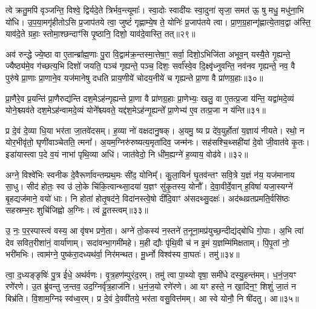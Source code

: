 {\anuvakamend[{उ॒प॒या॒मगृ॑हीतो जुहोमि॒ त्रिच॑त्वारिꣳशच्च॥९॥}]}

त्वे क्रतु॒मपि॑ वृञ्जन्ति॒ विश्वे॒ द्विर्यदे॒ते त्रिर्भव॒न्त्यूमाः᳚। स्वा॒दोः स्वादी॑यः स्वा॒दुना॑ सृजा॒ समत॑ ऊ॒ षु मधु॒ मधु॑ना॒भि यो॑धि। उ॒प॒या॒मगृ॑हीतो\-ऽसि प्र॒जाप॑तये त्वा॒ जुष्टं॑ गृह्णाम्ये॒ष ते॒ योनिः॑ प्र॒जाप॑तये त्वा। प्रा॒ण॒ग्र॒हान्गृ॑ह्णात्ये॒ताव॒द्वा अ॑स्ति॒ याव॑दे॒ते ग्रहाः॒ स्तोमा॒श्छन्दाꣳ॑सि पृ॒ष्ठानि॒ दिशो॒ याव॑दे॒वास्ति॒ तत्॥२९॥

अव॑ रुन्द्धे ज्ये॒ष्ठा वा ए॒तान्ब्रा᳚ह्म॒णाः पु॒रा वि॒द्वाम॑क्र॒न्तस्मा॒त्तेषा॒ꣳ॒ सर्वा॒ दिशो॒\-ऽभिजि॑ता अभूव॒न् यस्यै॒ते गृ॒ह्यन्ते॒ ज्यैष्ठ्य॑मे॒व ग॑च्छत्य॒भि दिशो॑ जयति॒ पञ्च॑ गृह्यन्ते॒ पञ्च॒ दिशः॒ सर्वा᳚स्वे॒व दि॒क्ष्वृ॑ध्नुवन्ति॒ नव॑नव गृह्यन्ते॒ नव॒ वै पुरु॑षे प्रा॒णाः प्रा॒णाने॒व यज॑मानेषु दधति प्राय॒णीये॑ चोदय॒नीये॑ च गृह्यन्ते प्रा॒णा वै प्रा॑णग्र॒हाः॥३०॥

प्रा॒णैरे॒व प्र॒यन्ति॑ प्रा॒णैरुद्य॑न्ति दश॒मे\-ऽह॑न्गृह्यन्ते प्रा॒णा वै प्रा॑णग्र॒हाः प्रा॒णेभ्यः॒ खलु॒ वा ए॒तत्प्र॒जा य॑न्ति॒ यद्वा॑मदे॒व्यं योने॒श्च्यव॑ते दश॒मे\-ऽह॑न्वामदे॒व्यं योने᳚श्च्यवते॒ यद्द॑श॒मे\-ऽह॑न्गृ॒ह्यन्ते᳚ प्रा॒णेभ्य॑ ए॒व तत्प्र॒जा न य॑न्ति॥३१॥

{\anuvakamend[{तत्प्रा॑णग्र॒हाः स॒प्तत्रिꣳ॑शच्च॥10॥}]}

प्र दे॒वं दे॒व्या धि॒या भर॑ता जा॒तवे॑दसम्। ह॒व्या नो॑ वक्षदानु॒षक्। अ॒यमु॒ ष्य प्र दे॑व॒युर्\mbox{}होता॑ य॒ज्ञाय॑ नीयते। रथो॒ न योर॒भीवृ॑तो॒ घृणी॑वाञ्चेतति॒ त्मना᳚। अ॒यम॒ग्निरु॑रुष्यत्य॒मृता॑दिव॒ जन्म॑नः। सह॑सश्चि॒थ्सही॑यां दे॒वो जी॒वात॑वे कृ॒तः। इडा॑यास्त्वा प॒दे व॒यं नाभा॑ पृथि॒व्या अधि॑। जात॑वेदो॒ नि धी॑म॒ह्यग्ने॑ ह॒व्याय॒ वोढ॑वे।॥३२॥

अग्ने॒ विश्वे॑भिः स्वनीक दे॒वैरूर्णा॑वन्तम्प्रथ॒मः सी॑द॒ योनिम्᳚। कु॒ला॒यिनं॑ घृ॒तव॑न्तꣳ सवि॒त्रे य॒ज्ञं न॑य॒ यज॑मानाय सा॒धु। सीद॑ होतः॒ स्व उ॑ लो॒के चि॑कि॒त्वान्थ्सा॒दया॑ य॒ज्ञꣳ सु॑कृ॒तस्य॒ योनौ᳚। दे॒वा॒वीर्दे॒वान् ह॒विषा॑ यजा॒स्यग्ने॑ बृ॒हद्यज॑माने॒ वयो॑ धाः। नि होता॑ होतृ॒षद॑ने॒ विदा॑नस्त्वे॒षो दी॑दि॒वाꣳ अ॑सदथ्सु॒दक्षः॑। अद॑ब्धव्रतप्रमति॒र्वसि॑ष्ठः सहस्रम्भ॒रः शुचि॑जिह्वो अ॒ग्निः। त्वं दू॒तस्त्वम्॥३३॥

उ॒ नः॒ प॒र॒स्पास्त्वं वस्य॒ आ वृ॑षभ प्रणे॒ता। अग्ने॑ तो॒कस्य॑ न॒स्तने॑ त॒नूना॒मप्र॑युच्छ॒न्दीद्य॑द्बोधि गो॒पाः। अ॒भि त्वा॑ देव सवित॒रीशा॑नं॒ वार्या॑णाम्। सदा॑वन्भा॒गमी॑महे। म॒ही द्यौः पृ॑थि॒वी च॑ न इ॒मं य॒ज्ञम्मि॑मिक्षताम्। पि॒पृ॒तां नो॒ भरी॑मभिः। त्वाम॑ग्ने॒ पुष्क॑रा॒दध्यथ॑र्वा॒ निर॑मन्थत। मू॒र्ध्नो विश्व॑स्य वा॒घतः॑। तमु॑॥३४॥

त्वा॒ द॒ध्यङ्ङृषिः॑ पु॒त्र ई॑धे॒ अथ॑र्वणः। वृ॒त्र॒हण॑म्पुरंद॒रम्। तमु॑ त्वा पा॒थ्यो वृषा॒ समी॑धे दस्यु॒हन्त॑मम्। ध॒नं॒ज॒यꣳ रणे॑रणे। उ॒त ब्रु॑वन्तु ज॒न्तव॒ उद॒ग्निर्वृ॑त्र॒हाज॑नि। ध॒नं॒ज॒यो रणे॑रणे। आ यꣳ हस्ते॒ न खा॒दिन॒ꣳ॒ शिशुं॑ जा॒तं न बिभ्र॑ति। वि॒शाम॒ग्निꣴ स्व॑ध्व॒रम्। प्र दे॒वं दे॒ववी॑तये॒ भर॑ता वसु॒वित्त॑मम्। आ स्वे योनौ॒ नि षी॑दतु। आ॥३५॥

